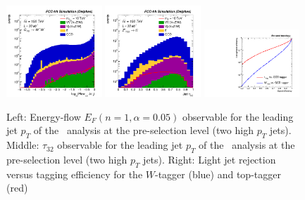 \documentclass[a4paper,11pt]{article}
\begin{document}
\begin{figure}[!htbp]\centering
\includegraphics[width=0.32\textwidth]{Fig/TMVA/Jet1_Flow15_sel0_nostack_logx-eps-converted-to.pdf}
\includegraphics[width=0.32\textwidth]{Fig/TMVA/Jet1_tau32_sel0_nostack_log-eps-converted-to.pdf}
\includegraphics[width=0.32\textwidth]{Fig/TMVA/effQCD_vs_effWhadBlue_thadRed_log.pdf}
\caption{Left: Energy-flow $E_{F}(n=1,\alpha=0.05)$ observable for the leading jet $p_T$ of the \rsg\ analysis at the pre-selection level (two high $p_T$ jets). Middle: $\tau_{32}$ observable for the leading jet $p_T$ of the \Zptt\ analysis at the pre-selection level (two high $p_T$ jets). Right: Light jet rejection versus tagging efficiency for the $W$-tagger (blue) and top-tagger (red)}
\label{fig:TMVA_final_result}
\end{figure}


\end{document}
